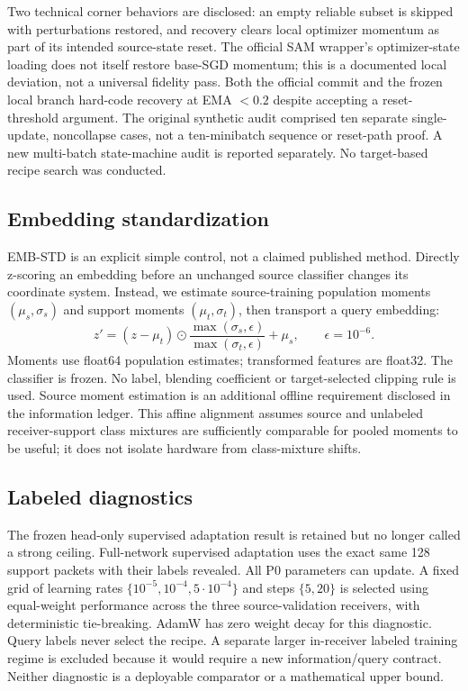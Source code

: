 Two technical corner behaviors are disclosed: an empty reliable subset is skipped with perturbations restored, and recovery clears local optimizer momentum as part of its intended source-state reset. The official SAM wrapper's optimizer-state loading does not itself restore base-SGD momentum; this is a documented local deviation, not a universal fidelity pass. Both the official commit and the frozen local branch hard-code recovery at EMA $<0.2$ despite accepting a reset-threshold argument. The original synthetic audit comprised ten separate single-update, noncollapse cases, not a ten-minibatch sequence or reset-path proof. A new multi-batch state-machine audit is reported separately. No target-based recipe search was conducted.

\subsection{Embedding standardization}
EMB-STD is an explicit simple control, not a claimed published method. Directly z-scoring an embedding before an unchanged source classifier changes its coordinate system. Instead, we estimate source-training population moments $(\mu_s,\sigma_s)$ and support moments $(\mu_t,\sigma_t)$, then transport a query embedding:
\[
z'=(z-\mu_t)\odot
\frac{\max(\sigma_s,\epsilon)}{\max(\sigma_t,\epsilon)}+\mu_s,\qquad \epsilon=10^{-6}.
\]
Moments use float64 population estimates; transformed features are float32. The classifier is frozen. No label, blending coefficient or target-selected clipping rule is used. Source moment estimation is an additional offline requirement disclosed in the information ledger. This affine alignment assumes source and unlabeled receiver-support class mixtures are sufficiently comparable for pooled moments to be useful; it does not isolate hardware from class-mixture shifts.

\subsection{Labeled diagnostics}
The frozen head-only supervised adaptation result is retained but no longer called a strong ceiling. Full-network supervised adaptation uses the exact same 128 support packets with their labels revealed. All P0 parameters can update. A fixed grid of learning rates $\{10^{-5},10^{-4},5\cdot10^{-4}\}$ and steps $\{5,20\}$ is selected using equal-weight performance across the three source-validation receivers, with deterministic tie-breaking. AdamW has zero weight decay for this diagnostic. Query labels never select the recipe. A separate larger in-receiver labeled training regime is excluded because it would require a new information/query contract. Neither diagnostic is a deployable comparator or a mathematical upper bound.

